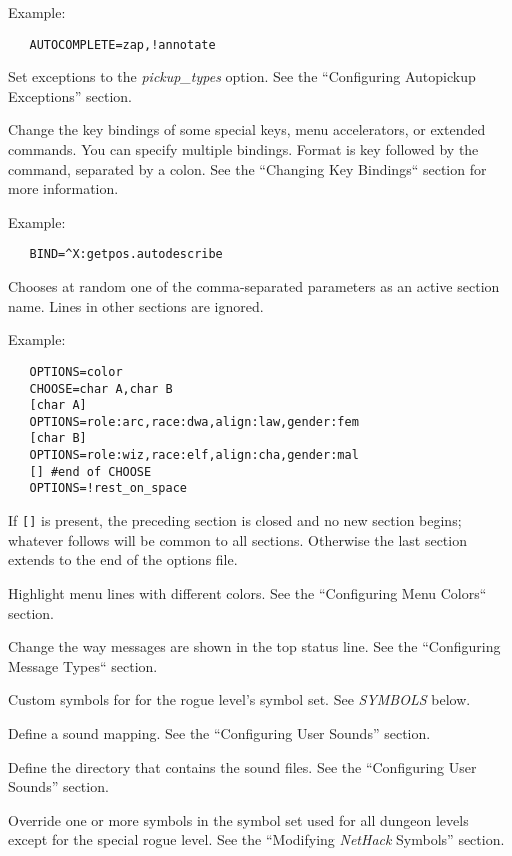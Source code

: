 Example:
\begin{verbatim}
   AUTOCOMPLETE=zap,!annotate
\end{verbatim}

\item[\bb{AUTOPICKUP\_EXCEPTION}]
Set exceptions to the {{\it pickup\_types\/}}
option. See the ``Configuring Autopickup Exceptions'' section.
\item[\bb{BINDINGS}]
Change the key bindings of some special keys, menu accelerators, or
extended commands. You can specify multiple bindings. Format is key
followed by the command, separated by a colon.
See the ``Changing Key Bindings`` section for more information.

Example:
\begin{verbatim}
   BIND=^X:getpos.autodescribe
\end{verbatim}

\item[\bb{CHOOSE}]
Chooses at random one of the comma-separated parameters as an active
section name.
Lines in other sections are ignored.

Example:
\begin{verbatim}
   OPTIONS=color
   CHOOSE=char A,char B
   [char A]
   OPTIONS=role:arc,race:dwa,align:law,gender:fem
   [char B]
   OPTIONS=role:wiz,race:elf,align:cha,gender:mal
   [] #end of CHOOSE
   OPTIONS=!rest_on_space
\end{verbatim}

If {\tt []} is present, the preceding section is closed and no new
section begins; whatever follows will be common to all sections.
Otherwise the last section extends to the end of the options file.

\item[\bb{MENUCOLOR}]
Highlight menu lines with different colors.
See the ``Configuring Menu Colors`` section.
\item[\bb{MSGTYPE}]
Change the way messages are shown in the top status line.
See the ``Configuring Message Types`` section.
\item[\bb{ROGUESYMBOLS}]
Custom symbols for for the rogue level's symbol set.
See {\it SYMBOLS} below.
\item[\bb{SOUND}]
Define a sound mapping.
See the ``Configuring User Sounds'' section.
\item[\bb{SOUNDDIR}]
Define the directory that contains the sound files.
See the ``Configuring User Sounds'' section.
\item[\bb{SYMBOLS}]
Override one or more symbols in the symbol set used for all dungeon
levels except for the special rogue level.
See the ``Modifying {\it NetHack\/} Symbols'' section.

